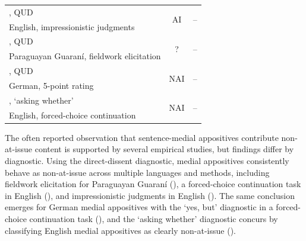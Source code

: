 \documentclass[times,linguex,xcolor]{glossa}
\begin{document}
\begin{table}[ht]
{\begin{tabular}{l c c}
      \citealt{koev_notions_2018}, QUD 
                                    & \multirow{2}{*}{AI}
                                                    & \multirow{2}{*}{--} \\ 
      \scriptsize English, impressionistic judgments  &  \\ \midrule

      \citealt{tonhauser_diagnosing_2012}, QUD     & \multirow{2}{*}{?}
                                                    & \multirow{2}{*}{--} \\ 
      \scriptsize Paraguayan Guaraní, fieldwork elicitation  &  \\ \midrule

      \citealt{chen_presuppositions_2024}, QUD     & \multirow{2}{*}{NAI}
                                                    & \multirow{2}{*}{--} \\ 
      \scriptsize German, 5-point rating  &  \\ \midrule\midrule

      \citealt{tonhauser_how_2018}, `asking whether'    & \multirow{2}{*}{NAI}
                                                    & \multirow{2}{*}{--} \\ 
      \scriptsize English, forced-choice continuation  &  \\ \bottomrule

  \end{tabular}}
  \end{table}

  The often reported observation that sentence-medial appositives contribute non-at-issue content is supported by several empirical studies, but findings differ by diagnostic. Using the direct-dissent diagnostic, medial appositives consistently behave as non-at-issue across multiple languages and methods, including fieldwork elicitation for Paraguayan Guaraní (\citealt{tonhauser_diagnosing_2012}), a forced-choice continuation task in English (\citealt{syrett_experimental_2015}), and impressionistic judgments in English (\citealt{potts_logic_2005,amaral_review_2007}). The same conclusion emerges for German medial appositives with the `yes, but' diagnostic in a forced-choice continuation task (\citealt{destruel_cross-linguistic_2015}), and the `asking whether' diagnostic concurs by classifying English medial appositives as clearly non-at-issue (\citealt{tonhauser_how_2018,solstad_cataphoric_2024}).
\end{document}
